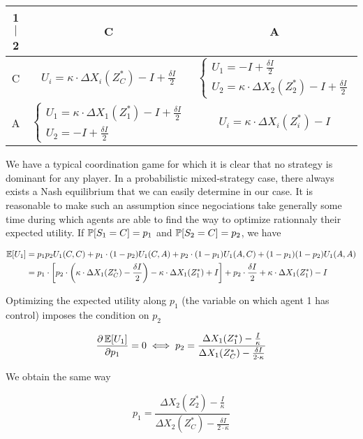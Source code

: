 \begin{itemize}
\medskip
\hfill
\begin{tabular}{ |c|c|c| } 

 \hline
 1 $|$ 2  & C & A \\ \hline
 C & $U_i = \kappa \cdot \Delta X_i(Z^{\ast}_C) - I + \frac{\delta I}{2}$
   & $\begin{cases}U_1 = -I + \frac{\delta I}{2} \\U_2 = \kappa \cdot \Delta X_2(Z^{\ast}_2)-I + \frac{\delta I}{2}\end{cases}$ \\ \hline
 A & $\begin{cases}U_1 = \kappa \cdot \Delta X_1(Z^{\ast}_1)-I + \frac{\delta I}{2}\\U_2 = -I + \frac{\delta I}{2}\end{cases}$
   & $U_i = \kappa \cdot \Delta X_i(Z^{\ast}_i) - I$ \\
 \hline
\end{tabular}
\hfill\hfill
\medskip

We have a typical coordination game for which it is clear that no strategy is dominant for any player. In a probabilistic mixed-strategy case, there always exists a Nash equilibrium that we can easily determine in our case. It is reasonable to make such an assumption since negociations take generally some time during which agents are able to find the way to optimize rationnaly their expected utility. If $\operatorname{\mathbb{P}}\!\left[S_1=C\right] = p_1$ and $\operatorname{\mathbb{P}}\!\left[S_2=C\right] = p_2$, we have

\[
\begin{split}
\operatorname{\mathbb{E}}\!\left[U_1\right] & =p_1 p_2 U_1(C,C) + p_1\cdot (1-p_2) U_1(C,A) + p_2 \cdot (1-p_1) U_1(A,C) + (1-p_1)(1-p_2) U_1(A,A)\\
& = p_1 \cdot \left[ p_2 \cdot \left(\kappa \cdot \Delta X_1(Z^{\ast}_C) - \frac{\delta I}{2} \right) - \kappa \cdot \Delta X_1(Z^{\ast}_1) + I\right] + p_2\cdot\frac{\delta I}{2} + \kappa\cdot\Delta X_1(Z^{\ast}_1)-I
\end{split}
\]

Optimizing the expected utility along $p_1$ (the variable on which agent 1 has control) imposes the condition on $p_2$

\[
\frac{\partial \operatorname{\mathbb{E}}\!\left[U_1\right]}{\partial p_1} = 0 \iff p_2 = \frac{\Delta X_1(Z^{\ast}_1)-\frac{I}{\kappa}}{\Delta X_1(Z^{\ast}_C) - \frac{\delta I}{2\cdot \kappa}}
\]

We obtain the same way

\[
p_1 = \frac{\Delta X_2(Z^{\ast}_2)-\frac{I}{\kappa}}{\Delta X_2(Z^{\ast}_C) - \frac{\delta I}{2\cdot\kappa}}
\]


\end{itemize}
